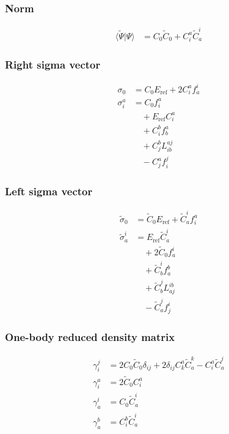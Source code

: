
\subsubsection{Norm}
\begin{align*}
\langle\widetilde{\Psi}\vert\Psi\rangle &= C_{0} \widetilde{C}_{0}   + C^{a}_{i}  \widetilde{C}^{i}_{a}
\end{align*}

\subsubsection{Right sigma vector}
\begin{align*}
\sigma_{0} &= C_{0} E_{\mathrm{ref}}   + 2 C^{a}_{i}  f^{i}_{a} \\
\sigma^{a}_{i} &= C_{0} f^{a}_{i}  \\
  &\quad  + E_{\mathrm{ref}} C^{a}_{i}  \\
  &\quad  + C^{b}_{i}  f^{a}_{b}  \\
  &\quad  + C^{b}_{j}  L^{aj}_{ib}  \\
  &\quad - C^{a}_{j}  f^{j}_{i}
\end{align*}

\subsubsection{Left sigma vector}
\begin{align*}
\widetilde{\sigma}_{0} &= \widetilde{C}_{0} E_{\mathrm{ref}}   + \widetilde{C}^{i}_{a}  f^{a}_{i} \\
\widetilde{\sigma}^{i}_{a} &= E_{\mathrm{ref}} \widetilde{C}^{i}_{a}  \\
  &\quad  + 2 \widetilde{C}_{0} f^{i}_{a}  \\
  &\quad  + \widetilde{C}^{i}_{b}  f^{b}_{a}  \\
  &\quad  + \widetilde{C}^{j}_{b}  L^{ib}_{aj}  \\
  &\quad - \widetilde{C}^{j}_{a}  f^{i}_{j}
\end{align*}

\subsubsection{One-body reduced density matrix}
\begin{align*}
\gamma^{j}_{i} &= 2 C_{0} \widetilde{C}_{0} \delta_{i j}   + 2 \delta_{i j} C^{a}_{k}  \widetilde{C}^{k}_{a}  - C^{a}_{i}  \widetilde{C}^{j}_{a} \\
\gamma^{a}_{i} &= 2 \widetilde{C}_{0} C^{a}_{i} \\
\gamma^{i}_{a} &= C_{0} \widetilde{C}^{i}_{a} \\
\gamma^{b}_{a} &= C^{b}_{i}  \widetilde{C}^{i}_{a}
\end{align*}

